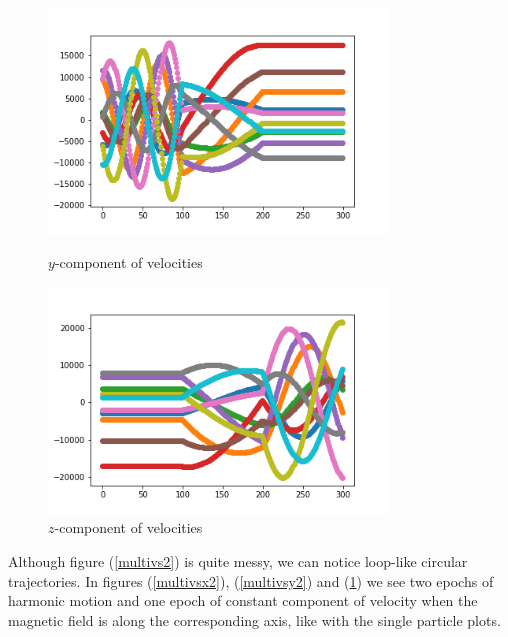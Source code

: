 \documentclass[12pt]{article}
\begin{document}
	\begin{figure}[H]
		\begin{multicols}{2}
			\includegraphics[width=\linewidth, height=6cm]{multivsy2.png} \caption{$y$-component of velocities} \label{multivsy2} \par
			\includegraphics[width=\linewidth, height=6cm]{multivsz2.png} \caption{$z$-component of velocities} \label{multivsz2} \par
		\end{multicols}
	\end{figure}
	\noindent Although figure (\ref{multivs2}) is quite messy, we can notice loop-like circular trajectories. In figures (\ref{multivsx2}), (\ref{multivsy2}) and (\ref{multivsz2}) we see two epochs of harmonic motion and one epoch of constant component of velocity when the magnetic field is along the corresponding axis, like with the single particle plots.
	
\end{document}

